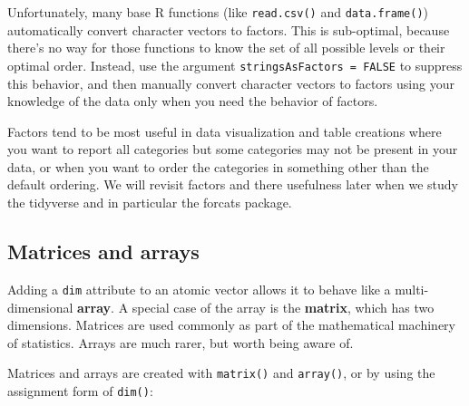 \documentclass[]{book}
\theoremstyle{definition}
\theoremstyle{definition}
\theoremstyle{definition}
\theoremstyle{remark}
\begin{document}
Unfortunately, many base R functions (like \texttt{read.csv()} and
\texttt{data.frame()}) automatically convert character vectors to
factors. This is sub-optimal, because there's no way for those functions
to know the set of all possible levels or their optimal order. Instead,
use the argument \texttt{stringsAsFactors\ =\ FALSE} to suppress this
behavior, and then manually convert character vectors to factors using
your knowledge of the data only when you need the behavior of factors.

Factors tend to be most useful in data visualization and table creations
where you want to report all categories but some categories may not be
present in your data, or when you want to order the categories in
something other than the default ordering. We will revisit factors and
there usefulness later when we study the tidyverse and in particular the
forcats package.

\subsection{Matrices and arrays}\label{matrices-and-arrays}

Adding a \texttt{dim} attribute to an atomic vector allows it to behave
like a multi-dimensional \textbf{array}. A special case of the array is
the \textbf{matrix}, which has two dimensions. Matrices are used
commonly as part of the mathematical machinery of statistics. Arrays are
much rarer, but worth being aware of.

Matrices and arrays are created with \texttt{matrix()} and
\texttt{array()}, or by using the assignment form of \texttt{dim()}:
\end{document}
